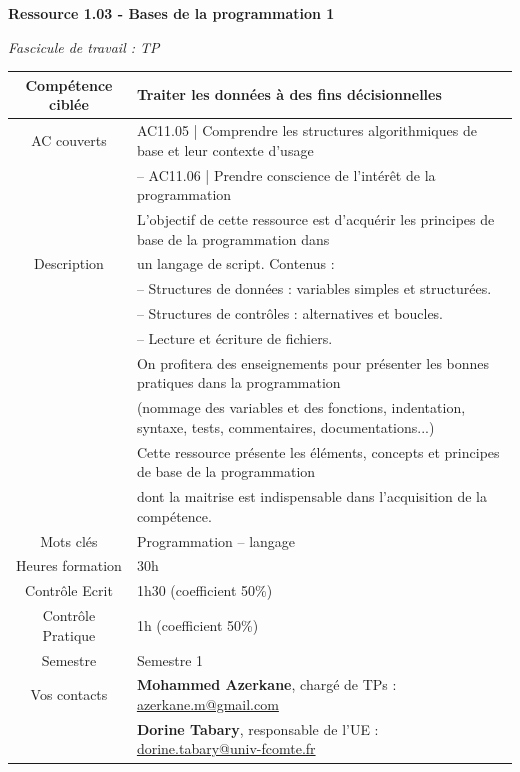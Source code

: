 \documentclass[10pt, a4paper]{article}
\begin{document}
\begin{titlepage}
    \begin{center}
            
        \huge
        \textbf{Ressource 1.03 - Bases de la programmation 1 }
            
        \LARGE
        \textit{Fascicule de travail : TP}
            
        \vspace{1cm}
            \small
        \begin{tabular}{|c|l|}\hline
             Compétence ciblée&  Traiter les données à des fins décisionnelles    \\\hline
             AC couverts&  AC11.05 | Comprendre les structures algorithmiques de base et leur contexte d’usage  \\
             &  – AC11.06 | Prendre conscience de l’intérêt de la programmation   \\ \hline
                & L’objectif de cette ressource est d’acquérir les principes de base de la programmation dans  \\
               Description & un langage de script. Contenus :\\
                &– Structures de données : variables simples et structurées.\\
                & – Structures de contrôles : alternatives et boucles.\\
                & – Lecture et écriture de fichiers.\\
                & On profitera des enseignements pour présenter les bonnes pratiques dans la programmation \\
                &(nommage des variables et des
fonctions, indentation, syntaxe, tests, commentaires, documentations...) \\
                &Cette ressource présente les éléments, concepts et principes de base de la programmation\\
                &  dont la maitrise est indispensable dans l’acquisition de la compétence.  \\
                \hline Mots clés &Programmation – langage\\\hline
                Heures formation&30h\\\hline
                Contrôle Ecrit &1h30 (coefficient 50\%)\\\hline
                Contrôle Pratique &1h (coefficient 50\%)\\\hline
                Semestre&Semestre 1\\\hline
                Vos contacts&\textbf{Mohammed Azerkane}, chargé de TPs : \url{azerkane.m@gmail.com}
\\
                &\textbf{Dorine Tabary}, responsable de l'UE : \url{dorine.tabary@univ-fcomte.fr}
\\\hline
        \end{tabular}





\end{center}
\end{titlepage}
\end{document}
